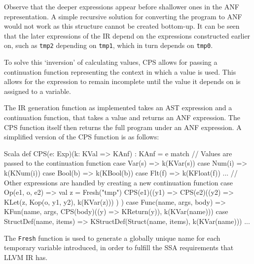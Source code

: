 
Observe that the deeper expressions appear before shallower ones in the ANF
representation. A simple recursive solution for converting the program to ANF would not work as this
structure cannot be created bottom-up. It can be seen that the later expressions of the IR depend on
the expressions constructed earlier on, such as \texttt{tmp2} depending on \texttt{tmp1}, which in
turn depends on \texttt{tmp0}.

To solve this `inversion' of calculating values, CPS allows for passing a continuation function
representing the context in which a value is used. This allows for the expression to remain
incomplete until the value it depends on is assigned to a variable.

The IR generation function as implemented takes an AST expression and a continuation function, that
takes a value and returns an ANF expression. The CPS function itself then returns the full program
under an ANF expression. A simplified version of the CPS function is as follows:

\begin{code}{Scala}
    def CPS(e: Exp)(k: KVal => KAnf) : KAnf = e match {
        // Values are passed to the continuation function
        case Var(s) => k(KVar(s))
        case Num(i) => k(KNum(i))
        case Bool(b) => k(KBool(b))
        case Flt(f) => k(KFloat(f))
        ...
        // Other expressions are handled by creating a new continuation function
        case Op(e1, o, e2) => {
            val z = Fresh("tmp")
            CPS(e1)((y1) =>
                CPS(e2)((y2) =>
                    KLet(z, Kop(o, y1, y2), k(KVar(z)))
                )
            )
        }
        case Func(name, args, body) =>
            KFun(name, args, CPS(body)((y) => KReturn(y)), k(KVar(name)))
        case StructDef(name, items) =>
            KStructDef(Struct(name, items), k(KVar(name)))
        ...
    }
\end{code}

The \texttt{Fresh} function is used to generate a globally unique name for each temporary variable
introduced, in order to fulfill the SSA requirements that LLVM IR has.

